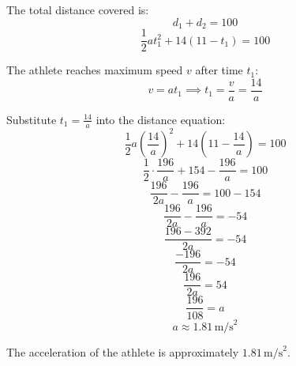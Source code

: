 The total distance covered is:
\[
d_1 + d_2 = 100
\]
\[
\frac{1}{2} a t_1^2 + 14 (11 - t_1) = 100
\]

The athlete reaches maximum speed \( v \) after time \( t_1 \):
\[
v = a t_1 \implies t_1 = \frac{v}{a} = \frac{14}{a}
\]

Substitute \( t_1 = \frac{14}{a} \) into the distance equation:
\[
\frac{1}{2} a \left(\frac{14}{a}\right)^2 + 14 \left(11 - \frac{14}{a}\right) = 100
\]
\[
\frac{1}{2} \cdot \frac{196}{a} + 154 - \frac{196}{a} = 100
\]
\[
\frac{196}{2a} - \frac{196}{a} = 100 - 154
\]
\[
\frac{196}{2a} - \frac{196}{a} = -54
\]
\[
\frac{196 - 392}{2a} = -54
\]
\[
\frac{-196}{2a} = -54
\]
\[
\frac{196}{2a} = 54
\]
\[
\frac{196}{108} = a
\]
\[
a \approx 1.81 \, \text{m/s}^2
\]

The acceleration of the athlete is approximately \(\boxed{1.81 \, \text{m/s}^2}\).